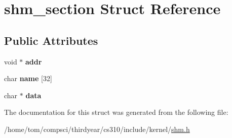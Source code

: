 \hypertarget{structshm__section}{}\section{shm\+\_\+section Struct Reference}
\label{structshm__section}
\subsection*{Public Attributes}
\begin{DoxyCompactItemize}
\item 
\mbox{\label{structshm__section_a7d932e3254f9f383054de7a045cd8fb0}} 
void $\ast$ {\bfseries addr}
\item 
\mbox{\label{structshm__section_aec930aa50a80069610ba6f2d4d76cda6}} 
char {\bfseries name} \mbox{[}32\mbox{]}
\item 
\mbox{\label{structshm__section_a8acca73a4bb922ab0517bca00efd61f6}} 
char $\ast$ {\bfseries data}
\end{DoxyCompactItemize}


The documentation for this struct was generated from the following file\+:\begin{DoxyCompactItemize}
\item 
/home/tom/compsci/thirdyear/cs310/include/kernel/\mbox{\hyperlink{shm_8h}{shm.\+h}}\end{DoxyCompactItemize}
